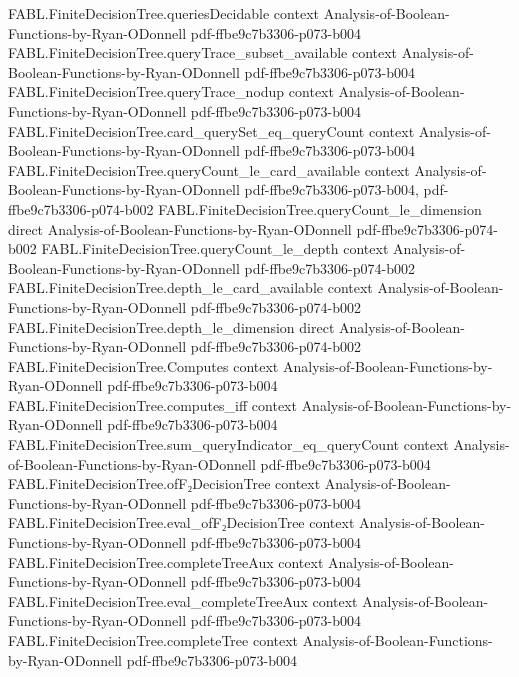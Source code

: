 \begin{theorem}
  {FABL.FiniteDecisionTree.queriesDecidable}
  {context}
  {Analysis-of-Boolean-Functions-by-Ryan-ODonnell}
  {pdf-ffbe9c7b3306-p073-b004}
\proofstep
  {FABL.FiniteDecisionTree.queryTrace_subset_available}
  {context}
  {Analysis-of-Boolean-Functions-by-Ryan-ODonnell}
  {pdf-ffbe9c7b3306-p073-b004}
\proofstep
  {FABL.FiniteDecisionTree.queryTrace_nodup}
  {context}
  {Analysis-of-Boolean-Functions-by-Ryan-ODonnell}
  {pdf-ffbe9c7b3306-p073-b004}
\proofstep
  {FABL.FiniteDecisionTree.card_querySet_eq_queryCount}
  {context}
  {Analysis-of-Boolean-Functions-by-Ryan-ODonnell}
  {pdf-ffbe9c7b3306-p073-b004}
\proofstep
  {FABL.FiniteDecisionTree.queryCount_le_card_available}
  {context}
  {Analysis-of-Boolean-Functions-by-Ryan-ODonnell}
  {pdf-ffbe9c7b3306-p073-b004,
    pdf-ffbe9c7b3306-p074-b002}
\proofstep
  {FABL.FiniteDecisionTree.queryCount_le_dimension}
  {direct}
  {Analysis-of-Boolean-Functions-by-Ryan-ODonnell}
  {pdf-ffbe9c7b3306-p074-b002}
\proofstep
  {FABL.FiniteDecisionTree.queryCount_le_depth}
  {context}
  {Analysis-of-Boolean-Functions-by-Ryan-ODonnell}
  {pdf-ffbe9c7b3306-p074-b002}
\proofstep
  {FABL.FiniteDecisionTree.depth_le_card_available}
  {context}
  {Analysis-of-Boolean-Functions-by-Ryan-ODonnell}
  {pdf-ffbe9c7b3306-p074-b002}
\proofstep
  {FABL.FiniteDecisionTree.depth_le_dimension}
  {direct}
  {Analysis-of-Boolean-Functions-by-Ryan-ODonnell}
  {pdf-ffbe9c7b3306-p074-b002}
\proofstep
  {FABL.FiniteDecisionTree.Computes}
  {context}
  {Analysis-of-Boolean-Functions-by-Ryan-ODonnell}
  {pdf-ffbe9c7b3306-p073-b004}
\proofstep
  {FABL.FiniteDecisionTree.computes_iff}
  {context}
  {Analysis-of-Boolean-Functions-by-Ryan-ODonnell}
  {pdf-ffbe9c7b3306-p073-b004}
\proofstep
  {FABL.FiniteDecisionTree.sum_queryIndicator_eq_queryCount}
  {context}
  {Analysis-of-Boolean-Functions-by-Ryan-ODonnell}
  {pdf-ffbe9c7b3306-p073-b004}
\proofstep
  {FABL.FiniteDecisionTree.ofF₂DecisionTree}
  {context}
  {Analysis-of-Boolean-Functions-by-Ryan-ODonnell}
  {pdf-ffbe9c7b3306-p073-b004}
\proofstep
  {FABL.FiniteDecisionTree.eval_ofF₂DecisionTree}
  {context}
  {Analysis-of-Boolean-Functions-by-Ryan-ODonnell}
  {pdf-ffbe9c7b3306-p073-b004}
\proofstep
  {FABL.FiniteDecisionTree.completeTreeAux}
  {context}
  {Analysis-of-Boolean-Functions-by-Ryan-ODonnell}
  {pdf-ffbe9c7b3306-p073-b004}
\proofstep
  {FABL.FiniteDecisionTree.eval_completeTreeAux}
  {context}
  {Analysis-of-Boolean-Functions-by-Ryan-ODonnell}
  {pdf-ffbe9c7b3306-p073-b004}
\proofstep
  {FABL.FiniteDecisionTree.completeTree}
  {context}
  {Analysis-of-Boolean-Functions-by-Ryan-ODonnell}
  {pdf-ffbe9c7b3306-p073-b004}

\end{theorem}
